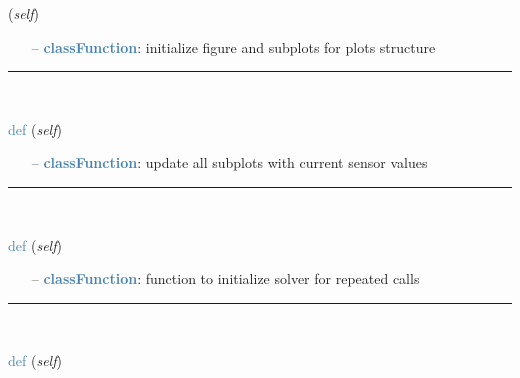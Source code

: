 \begin{itemize}[leftmargin=1.4cm]
\begin{itemize}[leftmargin=1.4cm]
\begin{itemize}[leftmargin=0.5cm]
\begin{itemize}[leftmargin=1.4cm]
\begin{itemize}[leftmargin=1.4cm]
\begin{itemize}[leftmargin=0.5cm]
\begin{itemize}[leftmargin=1.4cm]
\begin{itemize}[leftmargin=0.5cm]
\begin{itemize}[leftmargin=1.4cm]
\begin{itemize}[leftmargin=1.4cm]
\begin{flushleft}
({\it self})
\end{flushleft}
\setlength{\itemindent}{0.7cm}
\begin{itemize}[leftmargin=0.7cm]
  \item[--]  \textcolor{steelblue}{\bf classFunction}: initialize figure and subplots for plots structure\vspace{12pt}\end{itemize}
%
\noindent\rule{8cm}{0.75pt}\vspace{1pt} \\ 
\begin{flushleft}
\noindent \textcolor{steelblue}{def {\bf {}}}\label{sec:interactive:InteractiveDialog:UpdatePlots}
({\it self})
\end{flushleft}
\setlength{\itemindent}{0.7cm}
\begin{itemize}[leftmargin=0.7cm]
  \item[--]  \textcolor{steelblue}{\bf classFunction}: update all subplots with current sensor values\vspace{12pt}\end{itemize}
%
\noindent\rule{8cm}{0.75pt}\vspace{1pt} \\ 
\begin{flushleft}
\noindent \textcolor{steelblue}{def {\bf {}}}\label{sec:interactive:InteractiveDialog:InitializeSolver}
({\it self})
\end{flushleft}
\setlength{\itemindent}{0.7cm}
\begin{itemize}[leftmargin=0.7cm]
  \item[--]  \textcolor{steelblue}{\bf classFunction}: function to initialize solver for repeated calls\vspace{12pt}\end{itemize}
%
\noindent\rule{8cm}{0.75pt}\vspace{1pt} \\ 
\begin{flushleft}
\noindent \textcolor{steelblue}{def {\bf {}}}\label{sec:interactive:InteractiveDialog:FinalizeSolver}
({\it self})
\end{flushleft}
\setlength{\itemindent}{0.7cm}
\begin{itemize}[leftmargin=0.7cm]

\end{itemize}
\end{itemize}
\end{itemize}
\end{itemize}
\end{itemize}
\end{itemize}
\end{itemize}
\end{itemize}
\end{itemize}
\end{itemize}
\end{itemize}
